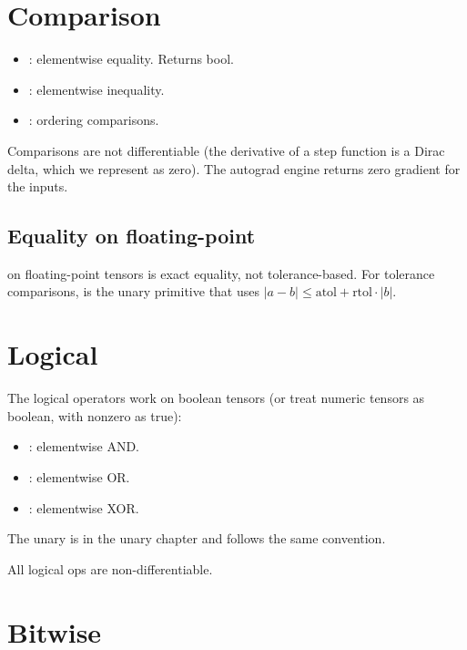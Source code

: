 \section{Comparison}
\label{sec:binary_functions:comparison}

\begin{itemize}
  \item {}: elementwise equality. Returns bool.
  \item {}: elementwise inequality.
  \item {}: ordering
    comparisons.
\end{itemize}

Comparisons are not differentiable (the derivative of a step
function is a Dirac delta, which we represent as zero). The
autograd engine returns zero gradient for the inputs.

\subsection{Equality on floating-point}
\label{ssec:binary_functions:fp_eq}

 on floating-point tensors is exact equality, not
tolerance-based. For tolerance comparisons,  is the unary primitive that uses
\(|a - b| \leq \text{atol} + \text{rtol} \cdot |b|\).

\section{Logical}
\label{sec:binary_functions:logical}

The logical operators work on boolean tensors (or treat numeric
tensors as boolean, with nonzero as true):

\begin{itemize}
  \item {}: elementwise AND.
  \item {}: elementwise OR.
  \item {}: elementwise XOR.
\end{itemize}

The unary  is in the unary chapter and follows
the same convention.

All logical ops are non-differentiable.

\section{Bitwise}
\label{sec:binary_functions:bitwise}

